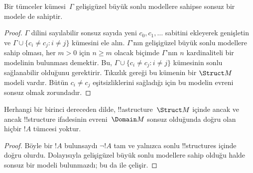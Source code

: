


\begin{thm}
 Bir tümceler kümesi~$\Gamma$ gelişigüzel büyük
sonlu modellere sahipse sonsuz bir modele de sahiptir.
\end{thm}

\begin{proof}
$\Gamma$ dilini sayılabilir sonsuz sayıda yeni $c_0,c_1,\dots$
sabitini ekleyerek genişletin ve
$\Gamma\cup\{c_i\neq c_j:i\neq j\}$ kümesini ele alın. $\Gamma$'nın
gelişigüzel büyük sonlu modellere sahip olması, her $m>0$ için
$n\geq m$ olacak biçimde $\Gamma$'nın $n$ kardinaliteli bir modelinin
bulunması demektir. Bu, $\Gamma\cup\{c_i\neq c_j:i\neq j\}$ kümesinin
sonlu sağlanabilir olduğunu gerektirir. Tıkızlık gereği bu kümenin bir
$\Struct M$ modeli vardır. Bütün $c_i\neq c_j$ eşitsizliklerini
sağladığı için bu modelin evreni sonsuz olmak zorundadır.
\end{proof}

\begin{prop}
Herhangi bir birinci dereceden dilde, !!a{structure}~$\Struct M$
içinde ancak ve ancak !!{structure} ifadesinin evreni~$\Domain M$
sonsuz olduğunda doğru olan hiçbir $!A$ tümcesi yoktur.
\end{prop}

\begin{proof}
Böyle bir $!A$ bulunsaydı $\lnot !A$ tam ve yalnızca sonlu
!!{structure}s içinde doğru olurdu. Dolayısıyla gelişigüzel büyük sonlu
modellere sahip olduğu halde sonsuz bir modeli bulunmazdı; bu da
 ile çelişir.
\end{proof}

